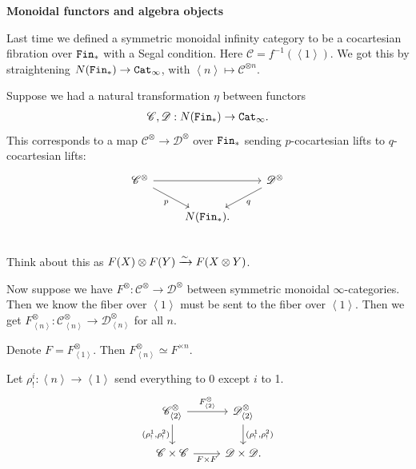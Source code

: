 \documentclass[12pt]{amsart}
\theoremstyle{definition}
\begin{document}
\begin{center}
    \textbf{Monoidal functors and algebra objects}
\end{center}

Last time we defined a symmetric monoidal infinity category to be a cocartesian fibration over $\texttt{Fin}_\ast$ with a Segal condition. Here $\mathscr{C} = f^{-1}(\left\langle 1 \right\rangle)$. We got this by straightening $N(\texttt{Fin}_\ast) \to \texttt{Cat}_\infty$, with $\left\langle n \right\rangle \mapsto \mathscr{C}^{\otimes n}$.

Suppose we had a natural transformation $\eta$ between functors
\begin{align*}
    \mathscr{C},\mathscr{D}: N(\texttt{Fin}_\ast) \to \texttt{Cat}_\infty.
\end{align*}
This corresponds to a map $\mathscr{C}^\otimes \to \mathscr{D}^\otimes$ over $\texttt{Fin}_\ast$ sending $p$-cocartesian lifts to $q$-cocartesian lifts:
\[ \begin{tikzcd}
    \mathscr{C}^{\otimes}\ar[dr,"p" below left]\ar[rr] &  & \mathscr{D}^{\otimes}\ar[dl,"q" below right]\\
     & N(\Fin_\ast). & \\
\end{tikzcd} \]
Think about this as $F(X) \otimes F(Y) \xrightarrow{\sim} F(X \otimes Y)$.

Now suppose we have $F^\otimes : \mathscr{C}^\otimes \to \mathscr{D}^\otimes$ between symmetric monoidal $\infty$-categories. Then we know the fiber over $\left\langle 1 \right\rangle$ must be sent to the fiber over $\left\langle 1 \right\rangle$. Then we get $F^{\otimes}_{\left\langle n \right\rangle}: \mathscr{C}^{\otimes}_{\left\langle n \right\rangle} \to \mathscr{D}^{\otimes}_{\left\langle n \right\rangle}$ for all $n$.

Denote $F = F^{\otimes}_{\left\langle 1 \right\rangle}$. Then $F^{\otimes}_{\left\langle n \right\rangle} \simeq F^{\times n}$.

Let $\rho^i_! : \left\langle n \right\rangle \to \left\langle 1 \right\rangle$ send everything to 0 except $i$ to 1.
\[ \begin{tikzcd}
    \mathscr{C}^{\otimes}_{\left\langle 2 \right\rangle}\rar["F^{\otimes}_{\left\langle 2 \right\rangle}" above]\dar["{(\rho^1_!,\rho^2_!)}" left]  & \mathscr{D}^{\otimes}_{\left\langle 2 \right\rangle}\dar["{(\rho^1_!,\rho^2_!)}" right] \\
    \mathscr{C} \times \mathscr{C}\rar["F \times F" below] & \mathscr{D} \times \mathscr{D}.
\end{tikzcd} \]
\end{document}
